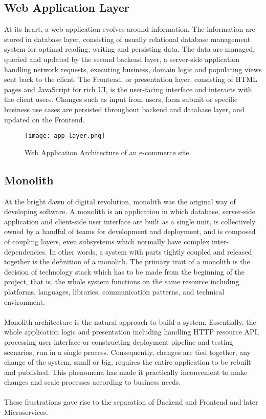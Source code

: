 \documentclass[a4paper]{book}
\begin{document}
\subsection{Web Application Layer}
At its heart, a web application evolves around information. The information are stored in database layer, consisting of usually relational database management system for optimal reading, writing and persisting data. The data are managed, queried and updated by the second backend layer, a server-side application handling network requests, executing business, domain logic and populating views sent back to the client. The Frontend, or presentation layer, consisting of HTML pages and JavaScript for rich UI, is the user-facing interface and interacts with the client users. Changes such as input from users, form submit or specific business use cases are persisted throughout backend and database layer, and updated on the Frontend. 
\begin{figure}
    \centering
    \texttt{[image: app-layer.png]}
    \caption{Web Application Architecture of an e-commerce site \cite{micro-frontends.org}}
    \label{fig:my_label}
\end{figure}

\subsection{Monolith}

At the bright dawn of digital revolution, monolith was the original way of developing software. A monolith is an application in which database, server-side application and client-side user interface are built as a single unit, is collectively owned by a handful of teams for development and deployment, and is composed of coupling layers, even subsystems which normally have complex inter-dependencies. In other words, a system with parts tightly coupled and released together is the definition of a monolith. The primary trait of a monolith is the decision of technology stack which has to be made from the beginning of the project, that is, the whole system functions on the same resource including platforms, languages, libraries, communication patterns, and technical environment.
\\ \\ 
Monolith architecture is the natural approach to build a system. Essentially, the whole application logic and presentation including handling HTTP resource API, processing user interface or constructing deployment pipeline and testing scenarios, run in a single process. Consequently, changes are tied together, any change of the system, small or big, requires the entire application to be rebuilt and published. This phenomena has made it practically inconvenient to make changes and scale processes according to business needs. 
\\ \\
These frustrations gave rise to the separation of Backend and Frontend and later Microservices.
\end{document}
